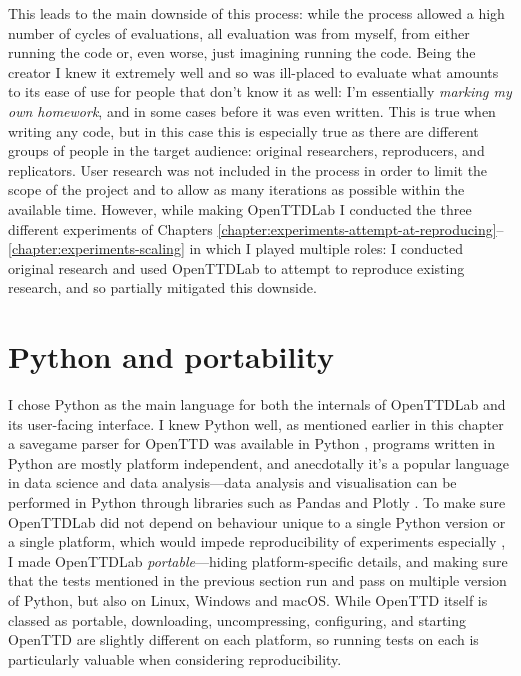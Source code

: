 \documentclass[logo,msc,dsti]{style/infthesis}    %
\begin{document}
{This leads to the main downside of this process: while the process allowed a high number of cycles of evaluations, all evaluation was from myself, from either running the code or, even worse, just imagining running the code. Being the creator I knew it extremely well and so was ill-placed to evaluate what amounts to its ease of use for people that don't know it as well: I'm essentially \emph{marking my own homework}, and in some cases before it was even written. This is true when writing any code, but in this case this is especially true as there are different groups of people in the target audience: original researchers, reproducers, and replicators. User research was not included in the process in order to limit the scope of the project and to allow as many iterations as possible within the available time. However, while making OpenTTDLab I conducted the three different experiments of Chapters \ref{chapter:experiments-attempt-at-reproducing}--\ref{chapter:experiments-scaling} in which I played multiple roles: I conducted original research and used OpenTTDLab to attempt to reproduce existing research, and so partially mitigated this downside.

\section{Python and portability}


I chose Python as the main language for both the internals of OpenTTDLab and its user-facing interface. I knew Python well, as mentioned earlier in this chapter a savegame parser for OpenTTD was available in Python \cite{Stout2024}, programs written in Python are mostly platform independent, and anecdotally it's a popular language in data science and data analysis---data analysis and visualisation can be performed in Python through libraries such as Pandas \cite{mckinney-proc-scipy-2010,reback2020pandas,} and Plotly \cite{plotly}. To make sure OpenTTDLab did not depend on behaviour unique to a single Python version or a single platform, which would impede reproducibility of experiments especially \cite{turingway2022}, I made OpenTTDLab \emph{portable}---hiding platform-specific details, and making sure that the tests mentioned in the previous section run and pass on multiple version of Python, but also on Linux, Windows and macOS. While OpenTTD itself is classed as portable, downloading, uncompressing, configuring, and starting OpenTTD are slightly different on each platform, so running tests on each is particularly valuable when considering reproducibility.

}
\end{document}

